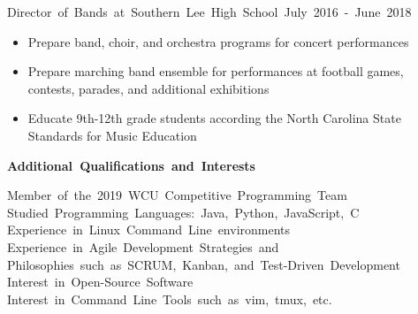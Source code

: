 \documentclass[12pt]{letter}
\begin{document}
    \vspace{0.5 mm}
    \hbox{Director of Bands at Southern Lee High School \hspace{130pt}
        July 2016 - June 2018}
    \vspace{-5 mm}
    \begin{itemize}
        \itemsep 0em
        \item Prepare band, choir, and orchestra programs for concert 
            performances
        \item Prepare marching band ensemble for performances at football
            games, contests, parades, and additional exhibitions
        \item Educate 9th-12th grade students according the North Carolina
            State Standards for Music Education
    \end{itemize}

    \vspace {10 mm}
    \hbox{\textbf{\large {Additional Qualifications and Interests}}}
    \vspace{3 mm}

    \hbox{Member of the 2019 WCU Competitive Programming Team}
    \hbox{Studied Programming Languages: Java, Python, JavaScript, C}
    \hbox{Experience in Linux Command Line environments}
    \hbox{Experience in Agile Development Strategies and} 
    \hbox{\quad Philosophies such as SCRUM, Kanban, 
        and Test-Driven Development}
    \hbox{Interest in Open-Source Software}
    \hbox{Interest in Command Line Tools such as vim, tmux, etc.}
\end{document}
